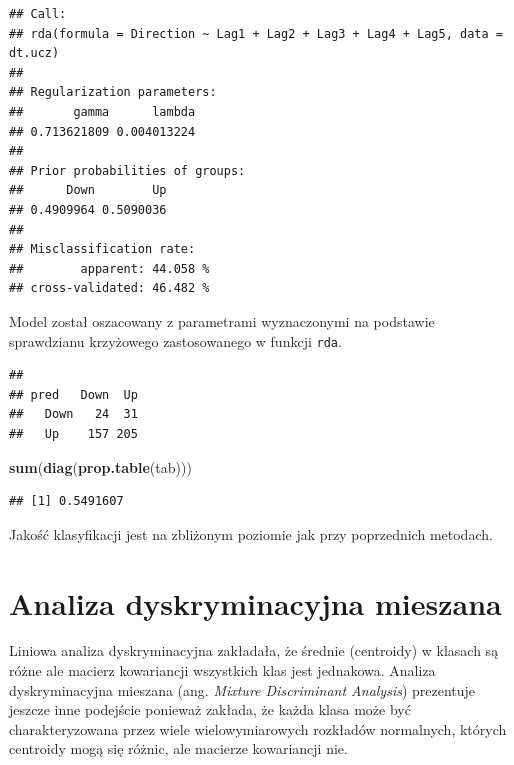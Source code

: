 \documentclass[
]{book}
\newenvironment{Shaded}{\begin{snugshade}}{\end{snugshade}}
\newcommand{\DataTypeTok}[1]{\textcolor[rgb]{0.13,0.29,0.53}{#1}}
\newcommand{\KeywordTok}[1]{\textcolor[rgb]{0.13,0.29,0.53}{\textbf{#1}}}
\newcommand{\NormalTok}[1]{#1}
\newcommand{\OperatorTok}[1]{\textcolor[rgb]{0.81,0.36,0.00}{\textbf{#1}}}
\newcommand{\StringTok}[1]{\textcolor[rgb]{0.31,0.60,0.02}{#1}}
\theoremstyle{plain}
\theoremstyle{definition}
\theoremstyle{definition}
\theoremstyle{definition}
\theoremstyle{definition}
\theoremstyle{remark}
\begin{document}
\begin{verbatim}
## Call: 
## rda(formula = Direction ~ Lag1 + Lag2 + Lag3 + Lag4 + Lag5, data = dt.ucz)
## 
## Regularization parameters: 
##       gamma      lambda 
## 0.713621809 0.004013224 
## 
## Prior probabilities of groups: 
##      Down        Up 
## 0.4909964 0.5090036 
## 
## Misclassification rate: 
##        apparent: 44.058 %
## cross-validated: 46.482 %
\end{verbatim}

Model został oszacowany z parametrami wyznaczonymi na podstawie sprawdzianu krzyżowego zastosowanego w funkcji \texttt{rda}.

\begin{Shaded}
\end{Shaded}

\begin{verbatim}
##       
## pred   Down  Up
##   Down   24  31
##   Up    157 205
\end{verbatim}

\begin{Shaded}
\begin{Highlighting}[]
\KeywordTok{sum}\NormalTok{(}\KeywordTok{diag}\NormalTok{(}\KeywordTok{prop.table}\NormalTok{(tab)))}
\end{Highlighting}
\end{Shaded}

\begin{verbatim}
## [1] 0.5491607
\end{verbatim}

Jakość klasyfikacji jest na zbliżonym poziomie jak przy poprzednich metodach.

\hypertarget{analiza-dyskryminacyjna-mieszana}{%
\section{Analiza dyskryminacyjna mieszana}\label{analiza-dyskryminacyjna-mieszana}}

Liniowa analiza dyskryminacyjna zakładała, że średnie (centroidy) w klasach są różne ale macierz kowariancji wszystkich klas jest jednakowa. Analiza dyskryminacyjna mieszana (ang. \emph{Mixture Discriminant Analysis}) prezentuje jeszcze inne podejście ponieważ zakłada, że każda klasa może być charakteryzowana przez wiele wielowymiarowych rozkładów normalnych, których centroidy mogą się różnic, ale macierze kowariancji nie.
\end{document}
